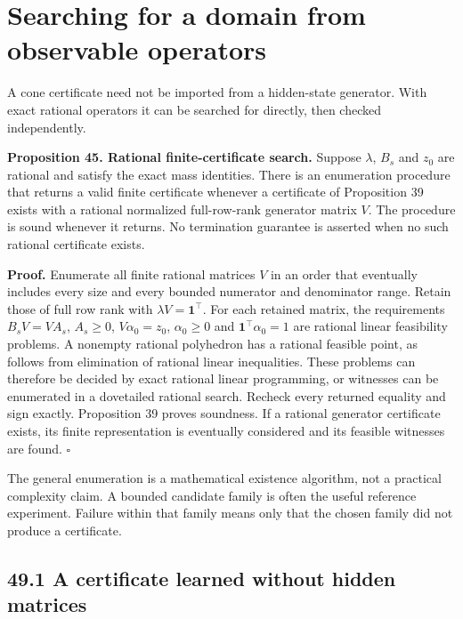 \section{Searching for a domain from observable operators}\label{LSM:searching-for-a-domain-from-observable-operators}

A cone certificate need not be imported from a hidden-state generator.
With exact rational operators it can be searched for directly, then
checked independently.

\textbf{Proposition 45. Rational finite-certificate search.} Suppose
\(\lambda\), \(B_s\) and \(z_0\) are rational and satisfy the exact mass
identities. There is an enumeration procedure that returns a valid
finite certificate whenever a certificate of Proposition 39 exists with
a rational normalized full-row-rank generator matrix \(V\). The
procedure is sound whenever it returns. No termination guarantee is
asserted when no such rational certificate exists.

\textbf{Proof.} Enumerate all finite rational matrices \(V\) in an order
that eventually includes every size and every bounded numerator and
denominator range. Retain those of full row rank with
\(\lambda V=\mathbf1^\top\). For each retained matrix, the requirements
\(B_sV=VA_s\), \(A_s\geq0\), \(V\alpha_0=z_0\), \(\alpha_0\geq0\) and
\(\mathbf1^\top\alpha_0=1\) are rational linear feasibility problems. A
nonempty rational polyhedron has a rational feasible point, as follows
from elimination of rational linear inequalities. These problems can
therefore be decided by exact rational linear programming, or witnesses
can be enumerated in a dovetailed rational search. Recheck every
returned equality and sign exactly. Proposition 39 proves soundness. If
a rational generator certificate exists, its finite representation is
eventually considered and its feasible witnesses are found. \(\square\)

The general enumeration is a mathematical existence algorithm, not a
practical complexity claim. A bounded candidate family is often the
useful reference experiment. Failure within that family means only that
the chosen family did not produce a certificate.

\subsection{49.1 A certificate learned without hidden
matrices}\label{LSM:a-certificate-learned-without-hidden-matrices}

